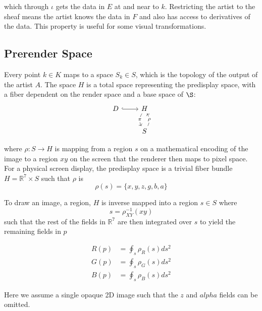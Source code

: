 \documentclass[../main.tex]{subfiles}
\begin{document}
which through $\iota$ gets the data in $E$ at and near to $k$. Restricting the artist to the sheaf means the artist knows the data in $F$ and also has access to derivatives of the data. This property is useful for some visual transformations. 

\subsection{Prerender Space}
\label{sec:display}

Every point $k \in K$ maps to a space $S_{k} \in S$, which is the topology of the output of the artist $A$. The space $H$ is a total space representing the predisplay space, with a fiber dependent on the render space and a base space of $\S$:
\begin{equation}
    \begin{tikzcd}
        D \arrow[r, hook] & H \arrow[d, "\pi" description, bend right] \\
                                    & S \arrow[u, "\rho" description, bend right] 
    \end{tikzcd}
\end{equation}

where $\rho: S \rightarrow H$ is mapping from a region $s$ on a mathematical encoding of the image to a region $xy$ on the screen that the renderer then maps to pixel space. For a physical screen display, the predisplay space is a trivial fiber bundle $H=\mathbb{R}^{7}\times S$ such that $\rho$ is
\begin{equation}
    \rho(s)  = \{x, y, z, g, b, a\}
    \label{eq:rho}
\end{equation}

To draw an image, a region, $H$ is inverse mapped into a region $s \in S$ where
\begin{equation}
s = \rho^{-1}_{XY}(xy)
\end{equation}
such that the rest of the fields in $\mathbb{R}^{7}$ are then integrated over $s$ to yield the remaining fields in $p$

\begin{align}
    R(p) &= \oint_s \rho_R(s)ds^{2}\\
    G(p) &= \oint_s \rho_G(s)ds^{2}\\
    B(p) &= \oint_s \rho_B(s)ds^{2}
\end{align}

Here we assume a single opaque 2D image such that the $z$ and $alpha$ fields can be omitted. 
\end{document}
